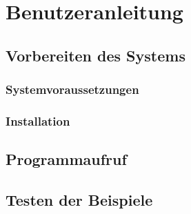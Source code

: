 \chapter{Benutzeranleitung}\label{ch:benutzeranleitung}


\section{Vorbereiten des Systems}\label{sec:vorbereiten-des-systems}

\subsection{Systemvoraussetzungen}\label{subsec:systemvoraussetzungen}

\subsection{Installation}\label{subsec:installation}


\section{Programmaufruf}\label{sec:programmaufruf}

\section{Testen der Beispiele}\label{sec:testen-der-beispiele}
